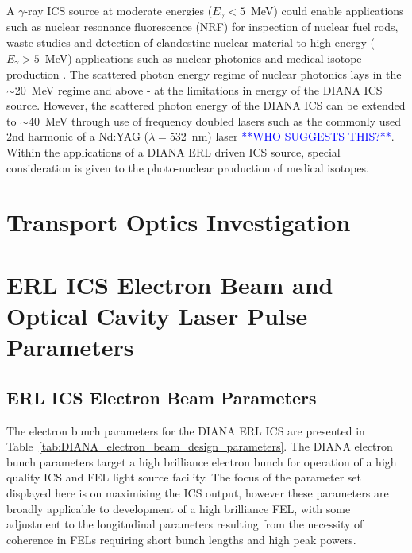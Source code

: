 \documentclass[../main.tex]{subfiles}
\begin{document}
A $\gamma$-ray ICS source at moderate energies ($E_{\gamma} < 5$~\si{\mega\electronvolt}) could enable applications such as nuclear resonance fluorescence (NRF) for inspection of nuclear fuel rods, waste studies and detection of clandestine nuclear material \cite{angell2015demonstration,bolind2015states} to high energy ($E_{\gamma} > 5$~\si{\mega\electronvolt}) applications such as nuclear photonics \cite{budker2021expanding} and medical isotope production \cite{habs2011production}. The scattered photon energy regime of nuclear photonics lays in the $\sim$20~\si{\mega\electronvolt} regime and above - at the limitations in energy of the DIANA ICS source. However, the scattered photon energy of the DIANA ICS can be extended to $\sim$40~\si{\mega\electronvolt} through use of frequency doubled lasers such as the commonly used 2nd harmonic of a Nd:YAG ($\lambda =$532~\si{\nano\meter}) laser \cite{} \textcolor{blue}{**WHO SUGGESTS THIS?**}. Within the applications of a DIANA ERL driven ICS source, special consideration is given to the photo-nuclear production of medical isotopes. 

\section{Transport Optics Investigation}
\label{sec:DIANA_transport_optics_investigation}

\section{ERL ICS Electron Beam and Optical Cavity Laser Pulse Parameters}
\subsection{ERL ICS Electron Beam Parameters }
The electron bunch parameters for the DIANA ERL ICS are presented in Table~\ref{tab:DIANA_electron_beam_design_parameters}. The DIANA electron bunch parameters target a high brilliance electron bunch for operation of a high quality ICS and FEL light source facility. The focus of the parameter set displayed here is on maximising the ICS output, however these parameters are broadly applicable to development of a high brilliance FEL, with some adjustment to the longitudinal parameters resulting from the necessity of coherence in FELs requiring short bunch lengths and high peak powers.    
\end{document}
